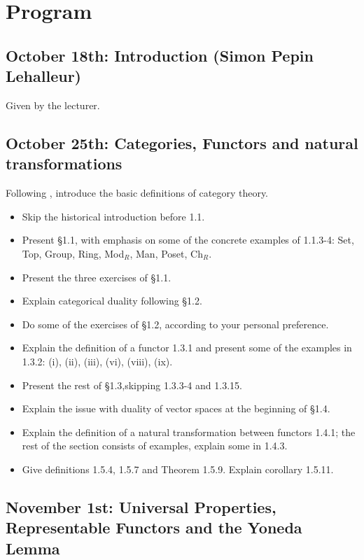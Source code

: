 \documentclass{amsart}
\theoremstyle{definition}
\theoremstyle{remark}
\begin{document}
\section*{Program}

\subsection{October 18th: Introduction (Simon Pepin Lehalleur)}

Given by the lecturer.

\subsection{October 25th: Categories, Functors and natural transformations}

Following \cite[Chapter 1]{Riehl_context}, introduce the basic definitions of category theory.

\begin{itemize}
\item Skip the historical introduction before 1.1.
\item Present \S 1.1, with emphasis on some of the concrete examples of 1.1.3-4: Set, Top, Group, Ring, Mod$_R$, Man, Poset, Ch$_R$.
\item Present the three exercises of \S 1.1.
\item Explain categorical duality following \S 1.2.
\item Do some of the exercises of \S 1.2, according to your personal preference.
\item Explain the definition of a functor 1.3.1 and present some of the examples in 1.3.2: (i), (ii), (iii), (vi), (viii), (ix).
\item Present the rest of \S 1.3,skipping 1.3.3-4 and 1.3.15.
\item Explain the issue with duality of vector spaces at the beginning of \S 1.4.
\item Explain the definition of a natural transformation between functors 1.4.1; the rest of the section consists of examples, explain some in 1.4.3.
\item Give definitions 1.5.4, 1.5.7 and Theorem 1.5.9. Explain corollary 1.5.11.
\end{itemize}

\subsection{November 1st: Universal Properties, Representable Functors and the Yoneda Lemma}
\end{document}
